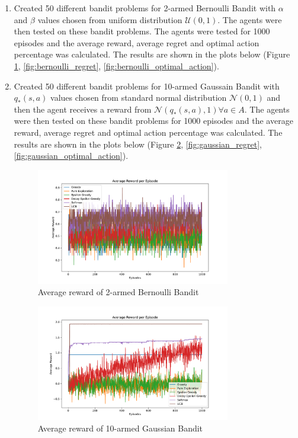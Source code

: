 \begin{enumerate}
    \item Created 50 different bandit problems for 2-armed Bernoulli Bandit with $\alpha$ and $\beta$ values chosen from uniform distribution $\mathcal{U}(0, 1)$. The agents were then tested on these bandit problems. The agents were tested for 1000 episodes and the average reward, average regret and optimal action percentage was calculated. The results are shown in the plots below (Figure \ref{fig:bernoulli_reward}, \ref{fig:bernoulli_regret}, \ref{fig:bernoulli_optimal_action}). 
    
    \item Created 50 different bandit problems for 10-armed Gaussain Bandit with $q_*(s, a)$ values chosen from standard normal distribution $\mathcal{N}(0, 1)$ and then the agent receives a reward from $\mathcal{N}(q_*(s, a), 1) \forall a \in A$. The agents were then tested on these bandit problems for 1000 episodes and the average reward, average regret and optimal action percentage was calculated. The results are shown in the plots below (Figure \ref{fig:gaussian_reward}, \ref{fig:gaussian_regret}, \ref{fig:gaussian_optimal_action}).
    
    \begin{figure}[h]
        \centering
        \includegraphics[width=0.8\textwidth]{images/mab/bernoulli_average_reward_per_episode.pdf}
        \caption{Average reward of 2-armed Bernoulli Bandit}
        \label{fig:bernoulli_reward}
    \end{figure}

    \begin{figure}[h]
        \centering
        \includegraphics[width=0.8\textwidth]{images/mab/10_arm_gaussian_average_reward_per_episode.pdf}
        \caption{Average reward of 10-armed Gaussian Bandit}
        \label{fig:gaussian_reward}
    \end{figure}


\end{enumerate}
